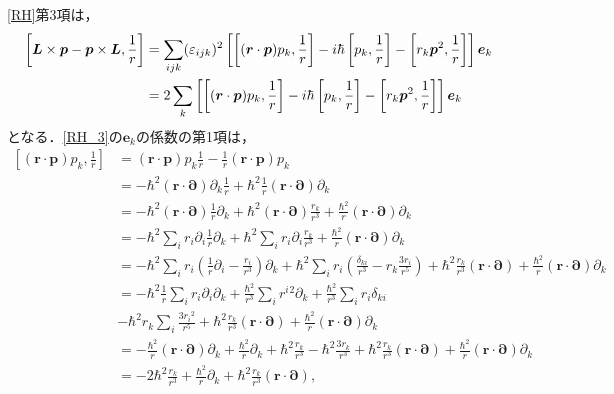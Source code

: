 \eqref{RH}第3項は，
\begin{align}
  \left[\boldsymbol{L}\times\boldsymbol{p} - \boldsymbol{p}\times\boldsymbol{L},\frac{1}{r}\right]
  & = \sum_{ijk}(\varepsilon_{ijk})^2\left[\left[(\boldsymbol{r}\cdot\boldsymbol{p})p_k,\frac{1}{r}\right] - i\hbar\left[p_k,\frac{1}{r}\right] - \left[r_k\boldsymbol{p}^2,\frac{1}{r}\right]\right]\boldsymbol{e}_k\notag\\
  & = 2\sum_k\left[\left[(\boldsymbol{r}\cdot\boldsymbol{p})p_k,\frac{1}{r}\right] - i\hbar\left[p_k,\frac{1}{r}\right] - \left[r_k\boldsymbol{p}^2,\frac{1}{r}\right]\right]\boldsymbol{e}_k\label{RH_3}
\end{align}
となる．\eqref{RH_3}の$\boldsymbol{e}_k$の係数の第1項は，
\begin{align*}
  \left[(\boldsymbol{r}\cdot\boldsymbol{p})p_k,\frac{1}{r}\right]
  & = (\boldsymbol{r}\cdot\boldsymbol{p})p_k\frac{1}{r} - \frac{1}{r}(\boldsymbol{r}\cdot\boldsymbol{p})p_k\\
  & = - \hbar^2(\boldsymbol{r}\cdot\boldsymbol{\partial})\partial_k\frac{1}{r} + \hbar^2\frac{1}{r}(\boldsymbol{r}\cdot\boldsymbol{\partial})\partial_k\\
  & = - \hbar^2(\boldsymbol{r}\cdot\boldsymbol{\partial})\frac{1}{r}\partial_k + \hbar^2(\boldsymbol{r}\cdot\boldsymbol{\partial})\frac{r_k}{r^3} + \frac{\hbar^2}{r}(\boldsymbol{r}\cdot\boldsymbol{\partial})\partial_k\\
  & = - \hbar^2\sum_ir_i\partial_i\frac{1}{r}\partial_k + \hbar^2\sum_ir_i\partial_i\frac{r_k}{r^3} + \frac{\hbar^2}{r}(\boldsymbol{r}\cdot\boldsymbol{\partial})\partial_k\\
  & = - \hbar^2\sum_ir_i\left(\frac{1}{r}\partial_i - \frac{r_i}{r^3}\right)\partial_k + \hbar^2\sum_ir_i\left(\frac{\delta_{ki}}{r^3} - r_k\frac{3r_i}{r^5}\right) + \hbar^2\frac{r_k}{r^3}(\boldsymbol{r}\cdot\boldsymbol{\partial}) + \frac{\hbar^2}{r}(\boldsymbol{r}\cdot\boldsymbol{\partial})\partial_k\\
  & = - \hbar^2\frac{1}{r}\sum_ir_i\partial_i\partial_k + \frac{\hbar^2}{r^3}\sum_ir^i{}^2\partial_k + \frac{\hbar^2}{r^3}\sum_ir_i\delta_{ki} \\
  & - \hbar^2r_k\sum_i\frac{3r_i{}^2}{r^5} + \hbar^2\frac{r_k}{r^3}(\boldsymbol{r}\cdot\boldsymbol{\partial}) + \frac{\hbar^2}{r}(\boldsymbol{r}\cdot\boldsymbol{\partial})\partial_k\\
  & = - \frac{\hbar^2}{r}(\boldsymbol{r}\cdot\boldsymbol{\partial})\partial_k + \frac{\hbar^2}{r}\partial_k + \hbar^2\frac{r_k}{r^3} - \hbar^2\frac{3r_k}{r^3} + \hbar^2\frac{r_k}{r^3}(\boldsymbol{r}\cdot\boldsymbol{\partial}) + \frac{\hbar^2}{r}(\boldsymbol{r}\cdot\boldsymbol{\partial})\partial_k\\
  & = - 2\hbar^2\frac{r_k}{r^3} + \frac{\hbar^2}{r}\partial_k + \hbar^2\frac{r_k}{r^3}(\boldsymbol{r}\cdot\boldsymbol{\partial}),
\end{align*}
